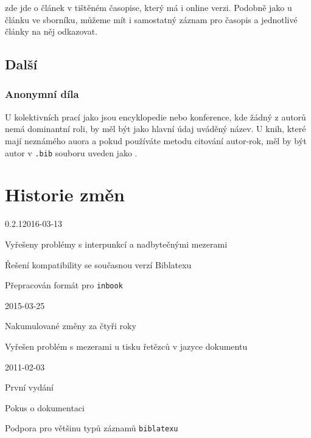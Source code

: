\documentclass[a4paper,10pt]{ltxdockit}
\def\t|#1|{\texttt{#1}}
\begin{document}
\noindent zde jde o článek v tištěném časopise, který má i online verzi. Podobně jako u článku ve sborníku, můžeme mít i samostatný záznam pro časopis a jednotlivé články na něj odkazovat.

\subsection{Další}

\subsubsection{Anonymní díla}

U kolektivních prací jako jsou encyklopedie nebo konference, kde žádný z autorů
nemá dominantní roli, by měl být jako hlavní údaj uváděný název. U knih, které
mají neznámého auora a pokud používáte metodu citování autor-rok, měl by být
autor v \t|.bib| souboru uveden jako .

\nocite{*}
\printbibliography[title={Ukázková bibliografie},heading={bibnumbered}]


\section{Historie změn}
\begin{changelog}
\begin{release}{0.2.1}{2016-03-13}
\item Vyřešeny problémy s interpunkcí a nadbytečnými mezerami
\item Řešení kompatibility se současnou verzí Biblatexu
\item Přepracován formát pro \verb|inbook|
\end{release}
\begin{release}{0.2}{2015-03-25}
\item Nakumulované změny za čtyři roky
\item Vyřešen problém s mezerami u tisku řetězců v jazyce dokumentu
\end{release}
\begin{release}{0.1}{2011-02-03}
\item První vydání
\item Pokus o dokumentaci
\item Podpora pro většinu typů záznamů \t|biblatexu|
\end{release}
\end{changelog}
\end{document}
